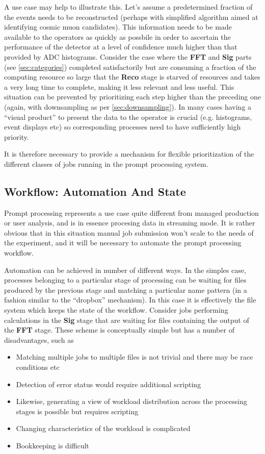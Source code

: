 \documentclass[pdftex,12pt,letter]{article}
\begin{document}
A use case may help to illustrate this. Let's assume a predetermined fraction of the events needs to
be reconstructed (perhaps with simplified algorithm aimed at identifying cosmic muon candidates).
This information needs to be made available to the operators as quickly as possbile in order to ascertain the performance
of the detector at a level of confidence much higher than that provided by ADC histograms.
Consider the case where the \textbf{FFT} and \textbf{Sig} parts (see \ref{sec:categories})
completed satisfactorily but are consuming a fraction of the computing resource so large that
the  \textbf{Reco} stage is starved of resources and takes a very long time to complete, making
it less relevant and less useful. This situation can be prevented by prioritizing each step higher
than the preceding one (again, with downsampling as per \ref{sec:downsampling}). In many
cases having a ``visual product'' to present the data to the operator is crucial (e.g. histograms,
event displays etc) so corresponding processes need to have sufficiently high priority.

It is therefore necessary to provide a mechanism for flexible prioritization of the different
classes of jobs running in the prompt processing system.



\subsection{Workflow: Automation And State}

Prompt processing represents a use case quite different from managed production or user analysis, and is 
in essence procesing data in streaming mode. It is rather obvious that in this situation manual job submission won't scale to the
needs of the experiment, and it will be necessary to automate the prompt processing workflow.

Automation can be achieved in  number of different ways. In the simples case, processes belonging to a particular stage
of processing can be waiting for files produced by the previous stage and matching a particular name pattern
(in a fashion similar to the ``dropbox'' mechanism). In this case it is effectively the file system which keeps the state of
the workflow. Consider jobs performing calculations in the \textbf{Sig} stage that are waiting for files
containing the output of the \textbf{FFT} stage. These scheme is conceptually simple but has a number of
disadvantages, such as
\begin{itemize}
\item Matching multiple jobs to multiple files is not trivial and there may be race conditions etc
\item Detection of error status would require additional scripting
\item Likewise, generating a view of workload distribution across the processing stages is possible but requires
scripting
\item Changing characteristics of the workload is complicated
\item Bookkeeping is difficult
\end{itemize}
\end{document}
